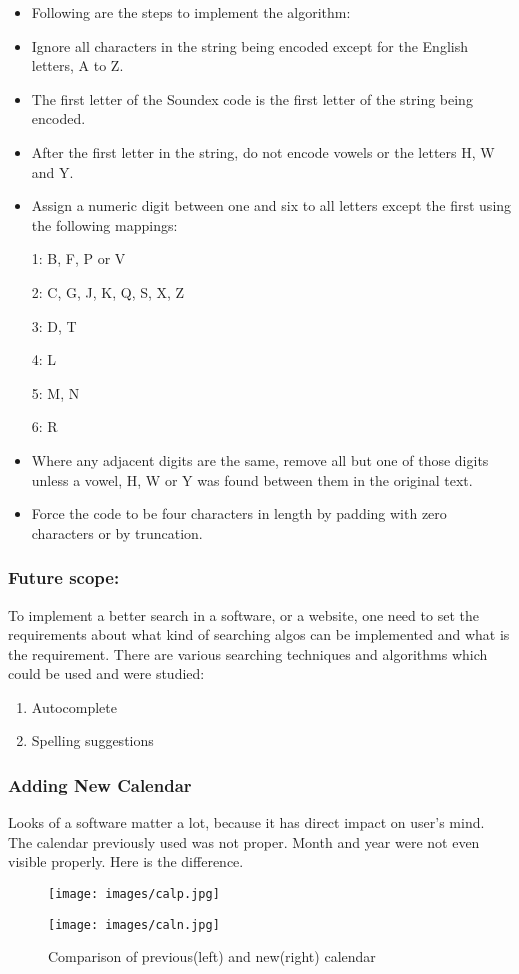 \begin{itemize}
\item Following are the steps to implement the algorithm: 
\item Ignore all characters in the string being encoded except for the English letters,
 A to Z.
\item The first letter of the Soundex code is the first letter of the string being encoded.
\item After the first letter in the string, do not encode vowels or the letters H, W and Y.
\item Assign a numeric digit between one and six to all letters except the first using the 
following mappings:

    1: B, F, P or V

    2: C, G, J, K, Q, S, X, Z

    3: D, T

    4: L

    5: M, N

    6: R

\item Where any adjacent digits are the same, remove all but one of those digits unless a vowel,
 H, W or Y was found between them in the original text.

\item Force the code to be four characters in length by padding with zero characters or by truncation.
\end{itemize}

\subsubsection{Future scope:}

To implement a better search in a software, or a website, one need to set the 
requirements about what kind of searching algos can be implemented and what 
is the requirement. There are various searching techniques and algorithms
which could be used and were studied: 
\begin{enumerate} 
\item Autocomplete
\item Spelling suggestions
\end{enumerate}

\subsubsection{Adding New Calendar}
Looks of a software matter a lot, because it has direct impact 
on user's mind. The calendar previously used was not proper. Month and
year were not even visible properly. Here is the difference.
\begin{figure}[ht]
\centering
\begin{minipage}[b]{0.45\linewidth}
\texttt{[image: images/calp.jpg]}
\end{minipage}
\quad
\begin{minipage}[b]{0.45\linewidth}
\texttt{[image: images/caln.jpg]}
\end{minipage}
\caption{Comparison of previous(left) and new(right) calendar}
\end{figure}
\newpage
